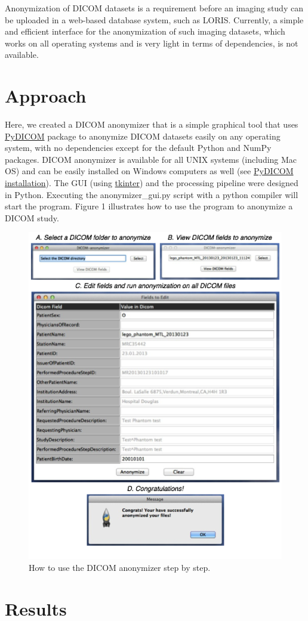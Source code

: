 \documentclass[twocolumn]{bmcart}%
\begin{document}
Anonymization of DICOM datasets is a requirement before an imaging study
can be uploaded in a web-based database system, such as
LORIS\cite{Das2011}. Currently, a simple and efficient interface for the
anonymization of such imaging datasets, which works on all operating
systems and is very light in terms of dependencies, is not available.

\section{Approach}\label{approach}

Here, we created a DICOM anonymizer that is a simple graphical tool that
uses \href{https://github.com/darcymason/pydicom}{PyDICOM} package to
anonymize DICOM datasets easily on any operating system, with no
dependencies except for the default Python and NumPy packages. DICOM
anonymizer is available for all UNIX systems (including Mac OS) and can
be easily installed on Windows computers as well (see
\href{http://pydicom.readthedocs.org/en/latest/getting_started.html}{PyDICOM
installation}). The GUI (using
\href{https://wiki.python.org/moin/TkInter}{tkinter}) and the processing
pipeline were designed in Python. Executing the anonymizer\_gui.py
script with a python compiler will start the program. Figure 1
illustrates how to use the program to anonymize a DICOM study.

\begin{figure}[h!]
  \includegraphics[width=.47\textwidth]{loris_screenshot.png}
  \caption{\label{centfig} How to use the DICOM anonymizer step by step.}
\end{figure}

\section{Results}\label{results}
\end{document}
